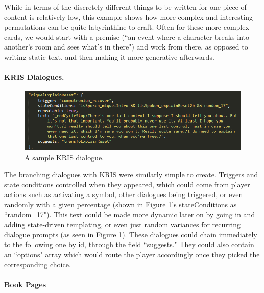 While in terms of the discretely different things to be written for one piece of content is relatively low, this example shows how more complex and interesting permutations can be quite labyrinthine to craft. Often for these more complex cards, we would start with a premise (``an event where a character breaks into another's room and sees what's in there") and work from there, as opposed to writing static text, and then making it more generative afterwards.

\paragraph{KRIS Dialogues.}\label{par:kris-dialogues}


\begin{figure}
    \centering
    \includegraphics[width=\textwidth]{figures/2-Ice-Bound/dialogue-data.png}
    \caption{A sample KRIS dialogue.}
    \label{fig:kris-dialogue-data}
\end{figure}


The branching dialogues with KRIS were similarly simple to create. Triggers and state conditions controlled when they appeared, which could come from player actions such as activating a symbol, other dialogues being triggered, or even randomly with a given percentage (shown in Figure \ref{fig:kris-dialogue-data}'s stateConditions as ``random\_17"). This text could be made more dynamic later on by going in and adding state-driven templating, or even just random variances for recurring dialogue prompts (as seen in Figure \ref{fig:kris-dialogue-data}). These dialogues could chain immediately to the following one by id, through the field ``suggests." They could also contain an ``options" array which would route the player accordingly once they picked the corresponding choice.

\paragraph{Book Pages}\label{par:book-pages}

